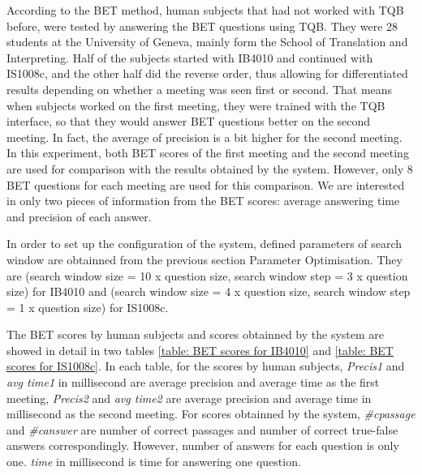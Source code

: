 According to the BET method, human subjects that had not worked with TQB before, were tested by answering the BET questions using TQB. They were 28 students at the University of Geneva, mainly form the School of Translation and Interpreting. Half of the subjects started with IB4010 and continued with IS1008c, and the other half did the reverse order, thus allowing for differentiated results depending on whether a meeting was seen first or second. That means when subjects worked on the first meeting, they were trained with the TQB interface, so that they would answer BET questions better on the second meeting. In fact, the average of precision is a bit higher for the second meeting. In this experiment, both BET scores of the first meeting and the second meeting are used for comparison with the results obtained by the system. However, only 8 BET questions for each meeting are used for this comparison.  We are interested in only two pieces of information from the BET scores: average answering time and precision of each answer. 

In order to set up the configuration of the system, defined parameters of search window are obtainned from the previous section Parameter Optimisation. They are (search window size = 10 x question size, search window step = 3 x question size) for IB4010 and (search window size = 4 x question size, search window step = 1 x question size) for IS1008c.

The BET scores by human subjects and scores obtainned by the system are showed in detail in two tables \ref{table: BET scores for IB4010} and \ref{table: BET scores for IS1008c}. In each table, for the scores by human subjects, \textit{Precis1} and \textit{avg time1} in millisecond are average precision and average time as the first meeting, \textit{Precis2} and \textit{avg time2} are average precision and average time in millisecond as the second meeting. For scores obtainned by the system, \textit{\#cpassage} and \textit{\#canswer} are number of correct passages and number of correct true-false answers correspondingly. However, number of answers for each question is only one. \textit{time} in millisecond is time for answering one question.




